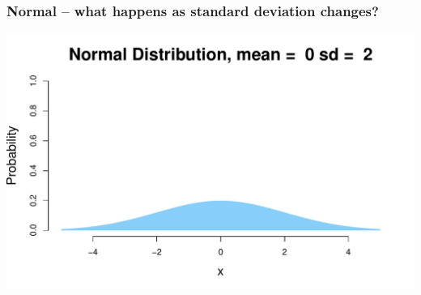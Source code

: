 \documentclass[aspectratio=169]{beamer}
\theoremstyle{principle}
\begin{document}
\begin{frame}
\frametitle{Normal -- what happens as standard deviation changes?}

\begin{center}
\includegraphics[scale=0.5]{Normal_0_2.pdf}
\end{center}

\end{frame}
\end{document}
